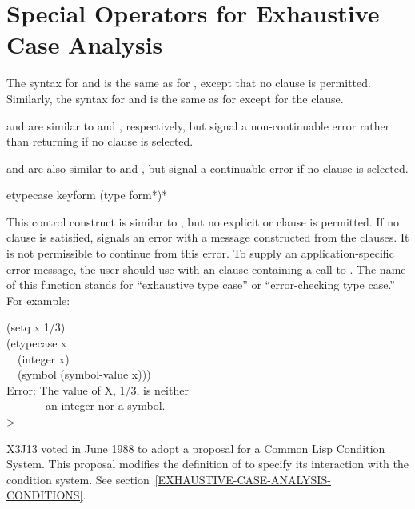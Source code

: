 \section{Special Operators for Exhaustive Case Analysis}
\label{EXHAUSTIVE-CASE-ANALYSIS}

The syntax for  and  is the same as for
, except that no  clause is permitted.
Similarly, the syntax for  and  is the same as for
 except for the  clause.

 and  are similar to  and ,
respectively, but signal a non-continuable error rather than returning
{\false} if no clause is selected.

 and  are also similar to  and ,
but signal a continuable error if no clause is selected.

\begin{defmac}
etypecase keyform {(type {form}*)}*

\begin{obsolete}\noindent
This control construct is similar to ,
but no explicit  or  clause is permitted.
If no clause is satisfied,  signals an error with
a message constructed from the clauses.  It is not permissible to
continue from this error.  To supply an application-specific error message, the
user should use  with an  clause containing a call
to .  The name of this function stands for ``exhaustive
type case'' or ``error-checking type case.''
For example:
\begin{lisp}
(setq x 1/3) \\
(etypecase x \\
~~(integer x) \\
~~(symbol (symbol-value x))) \\
Error: The value of X, 1/3, is neither \\
~~~~~~~an integer nor a symbol. \\
>
\end{lisp}
\end{obsolete}

\begin{new}
X3J13 voted in June 1988
to adopt a proposal for a Common Lisp Condition System. 
This proposal modifies the definition of  to specify its
interaction with the condition system.
See section~\ref{EXHAUSTIVE-CASE-ANALYSIS-CONDITIONS}.
\end{new}
\end{defmac}


